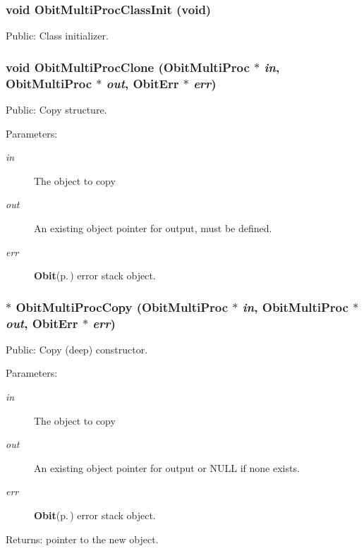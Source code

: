 \subsubsection{\setlength{\rightskip}{0pt plus 5cm}void Obit\-Multi\-Proc\-Class\-Init (void)}\label{ObitMultiProc_8h_a5}


Public: Class initializer. 

\subsubsection{\setlength{\rightskip}{0pt plus 5cm}void Obit\-Multi\-Proc\-Clone ({\bf Obit\-Multi\-Proc} $\ast$ {\em in}, {\bf Obit\-Multi\-Proc} $\ast$ {\em out}, {\bf Obit\-Err} $\ast$ {\em err})}\label{ObitMultiProc_8h_a16}


Public: Copy structure. 

\begin{Desc}
\item[Parameters:]
\begin{description}
\item[{\em in}]The object to copy \item[{\em out}]An existing object pointer for output, must be defined. \item[{\em err}]{\bf Obit}{\rm (p.\,\pageref{structObit})} error stack object. \end{description}
\end{Desc}
\subsubsection{$\ast$ Obit\-Multi\-Proc\-Copy ({\bf Obit\-Multi\-Proc} $\ast$ {\em in}, {\bf Obit\-Multi\-Proc} $\ast$ {\em out}, {\bf Obit\-Err} $\ast$ {\em err})}\label{ObitMultiProc_8h_a15}


Public: Copy (deep) constructor. 

\begin{Desc}
\item[Parameters:]
\begin{description}
\item[{\em in}]The object to copy \item[{\em out}]An existing object pointer for output or NULL if none exists. \item[{\em err}]{\bf Obit}{\rm (p.\,\pageref{structObit})} error stack object. \end{description}
\end{Desc}
\begin{Desc}
\item[Returns:]pointer to the new object. \end{Desc}
